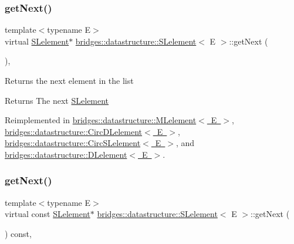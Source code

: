 \subsubsection{\texorpdfstring{getNext()}{getNext()}\hspace{0.1cm}{\footnotesize\ttfamily [1/2]}}
{\footnotesize\ttfamily template$<$typename E$>$ \\
virtual \mbox{\hyperlink{classbridges_1_1datastructure_1_1_s_lelement}{S\+Lelement}}$\ast$ \mbox{\hyperlink{classbridges_1_1datastructure_1_1_s_lelement}{bridges\+::datastructure\+::\+S\+Lelement}}$<$ E $>$\+::get\+Next (\begin{DoxyParamCaption}{ }\end{DoxyParamCaption})\hspace{0.3cm}{\ttfamily [inline]}, {\ttfamily [virtual]}}

Returns the next element in the list \begin{DoxyReturn}{Returns}
The next \mbox{\hyperlink{classbridges_1_1datastructure_1_1_s_lelement}{S\+Lelement}} 
\end{DoxyReturn}


Reimplemented in \mbox{\hyperlink{classbridges_1_1datastructure_1_1_m_lelement_a47b417db0b948b6899eece572bef9274}{bridges\+::datastructure\+::\+M\+Lelement$<$ E $>$}}, \mbox{\hyperlink{classbridges_1_1datastructure_1_1_circ_d_lelement_a80681d0382643a6df21da1bec4067004}{bridges\+::datastructure\+::\+Circ\+D\+Lelement$<$ E $>$}}, \mbox{\hyperlink{classbridges_1_1datastructure_1_1_circ_s_lelement_aff77056ace1361a35a09dc006eba34a3}{bridges\+::datastructure\+::\+Circ\+S\+Lelement$<$ E $>$}}, and \mbox{\hyperlink{classbridges_1_1datastructure_1_1_d_lelement_a63212051ea77d74bd751dea00288d2be}{bridges\+::datastructure\+::\+D\+Lelement$<$ E $>$}}.

\mbox{\label{classbridges_1_1datastructure_1_1_s_lelement_a8c62cb82fa64bbfe9ebb7334a5fea417}} 
\subsubsection{\texorpdfstring{getNext()}{getNext()}\hspace{0.1cm}{\footnotesize\ttfamily [2/2]}}
{\footnotesize\ttfamily template$<$typename E$>$ \\
virtual const \mbox{\hyperlink{classbridges_1_1datastructure_1_1_s_lelement}{S\+Lelement}}$\ast$ \mbox{\hyperlink{classbridges_1_1datastructure_1_1_s_lelement}{bridges\+::datastructure\+::\+S\+Lelement}}$<$ E $>$\+::get\+Next (\begin{DoxyParamCaption}{ }\end{DoxyParamCaption}) const\hspace{0.3cm}{\ttfamily [inline]}, {\ttfamily [virtual]}}

